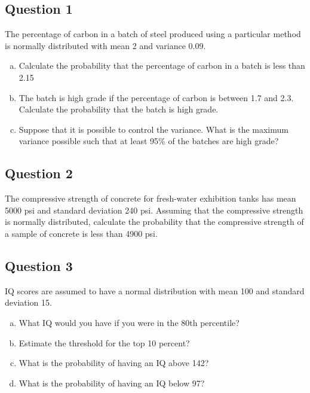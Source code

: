 \documentclass[]{report}
\begin{document}
\subsection*{Question 1}
The percentage of carbon in a batch of steel produced using a particular method is normally distributed with mean 2 and variance 0.09. 

\begin{enumerate}[(a)]
	\item Calculate the probability that the percentage of carbon in a batch is less than 2.15
	
	\item The batch is high grade if the percentage of carbon is between 1.7 and 2.3. Calculate the probability that the batch is high grade. 
	
	\item Suppose that it is possible to control the variance. What is the maximum variance possible such that at least 95\% of the batches are high grade?
\end{enumerate}

\subsection*{Question 2}
The compressive strength of concrete for fresh-water exhibition tanks has mean 5000 psi and standard deviation 240 psi. Assuming that the compressive strength is normally distributed, calculate the probability that the compressive strength of a sample of concrete is less than 4900 psi.


\subsection*{Question 3}
IQ scores are assumed to have a normal distribution with mean 100 and standard deviation 15.

\begin{enumerate}[(a)]
	\item What IQ would you have if you were in the 80th percentile?
	\item Estimate the threshold for the top 10 percent?
	\item What is the probability of having an IQ above 142?
	\item What is the probability of having an IQ below 97?
\end{enumerate}
\end{document}
